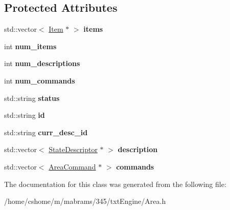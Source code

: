 \subsection*{Protected Attributes}
\begin{DoxyCompactItemize}
\item 
\hypertarget{class_area_a8fcfd7b9f54f722a6bf8c68ac26ea4f6}{
std::vector$<$ \hyperlink{class_item}{Item} $\ast$ $>$ {\bfseries items}}
\label{class_area_a8fcfd7b9f54f722a6bf8c68ac26ea4f6}

\item 
\hypertarget{class_area_a29d6271cf822fe3c7865e249643b0728}{
int {\bfseries num\_\-items}}
\label{class_area_a29d6271cf822fe3c7865e249643b0728}

\item 
\hypertarget{class_area_a4ec123111d0eb0346cc3fa55ee7328e9}{
int {\bfseries num\_\-descriptions}}
\label{class_area_a4ec123111d0eb0346cc3fa55ee7328e9}

\item 
\hypertarget{class_area_a698aec5d64c6990033fd3b029c40c117}{
int {\bfseries num\_\-commands}}
\label{class_area_a698aec5d64c6990033fd3b029c40c117}

\item 
\hypertarget{class_area_ab5b23c6cefb5ff678f5544d7b5900b7b}{
std::string {\bfseries status}}
\label{class_area_ab5b23c6cefb5ff678f5544d7b5900b7b}

\item 
\hypertarget{class_area_a71dbaaeab0c2f2d0ba296593e59b22ce}{
std::string {\bfseries id}}
\label{class_area_a71dbaaeab0c2f2d0ba296593e59b22ce}

\item 
\hypertarget{class_area_a21fb316841238b230f351620ec97e3a6}{
std::string {\bfseries curr\_\-desc\_\-id}}
\label{class_area_a21fb316841238b230f351620ec97e3a6}

\item 
\hypertarget{class_area_af699bd40b15954f8403309672f01d44b}{
std::vector$<$ \hyperlink{class_state_descriptor}{StateDescriptor} $\ast$ $>$ {\bfseries description}}
\label{class_area_af699bd40b15954f8403309672f01d44b}

\item 
\hypertarget{class_area_a5679c7f10791af2545d6853cf0f31ce1}{
std::vector$<$ \hyperlink{class_area_command}{AreaCommand} $\ast$ $>$ {\bfseries commands}}
\label{class_area_a5679c7f10791af2545d6853cf0f31ce1}

\end{DoxyCompactItemize}


The documentation for this class was generated from the following file:\begin{DoxyCompactItemize}
\item 
/home/cshome/m/mabrams/345/txtEngine/Area.h\end{DoxyCompactItemize}

